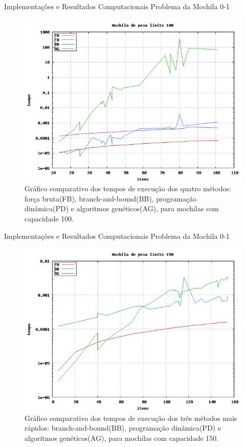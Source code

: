 \documentclass[slidestop,compress,mathserif]{beamer}
\begin{document}
\begin{frame} {Implementações e Resultados Computacionais} {Problema da Mochila 0-1}

\scriptsize
\begin{figure}[htp]
	\centering
	\includegraphics[scale=0.3]{images/w100.jpg}
	\caption{\tiny{Gráfico comparativo dos tempos de execução dos quatro métodos: força bruta(FB), branch-and-bound(BB), programação dinâmica(PD) e algoritmos genéticos(AG), para mochilas com capacidade 100.}}
\end{figure}

\end{frame}


\begin{frame} {Implementações e Resultados Computacionais} {Problema da Mochila 0-1}

\scriptsize
\begin{figure}[htp]
	\centering
	\includegraphics[scale=0.3]{images/w150.jpg}
	\caption{\tiny{Gráfico comparativo dos tempos de execução dos três métodos mais rápidos: branch-and-bound(BB), programação dinâmica(PD) e algoritmos genéticos(AG), para mochilas com capacidade 150.}}
\end{figure}

\end{frame}
\end{document}
